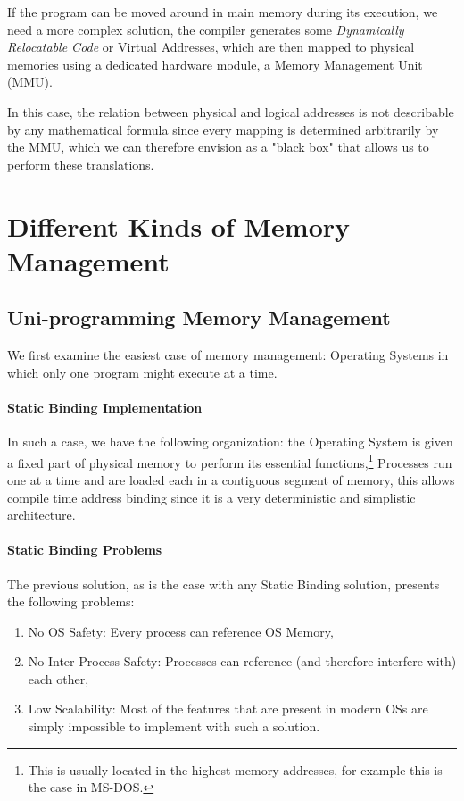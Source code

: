 \documentclass[openright, twoside]{report}
\theoremstyle{definition}
\theoremstyle{example}
\begin{document}
		If the program can be moved around in main memory during its execution, we need a more complex solution, the compiler 
		generates some \emph{Dynamically Relocatable Code} or Virtual Addresses, which are then mapped to physical memories using 
		a dedicated hardware module, a Memory Management Unit (MMU).

		In this case, the relation between physical and logical addresses is not describable by any mathematical formula since 
		every mapping is determined arbitrarily by the MMU, which we can therefore envision as a "black box" that allows us 
		to perform these translations.
	
	\section{Different Kinds of Memory Management}
		\subsection{Uni-programming Memory Management}

		We first examine the easiest case of memory management: Operating Systems in which only one program might execute at a time.

		\paragraph{Static Binding Implementation}
		In such a case, we have the following organization: the Operating System is given a fixed part of physical memory to perform 
		its essential functions,\footnote{This is usually located in the highest memory addresses, for example this is the case in MS-DOS.}
		Processes run one at a time and are loaded each in a contiguous segment of memory, this allows compile time address binding 
		since it is a very deterministic and simplistic architecture.

		\paragraph{Static Binding Problems}
		The previous solution, as is the case with any Static Binding solution, presents the following problems:
		\begin{enumerate}
			\item No OS Safety: Every process can reference OS Memory,
			\item No Inter-Process Safety: Processes can reference (and therefore interfere with) each other,
			\item Low Scalability: Most of the features that are present in modern OSs are simply impossible to 
			implement with such a solution.
		\end{enumerate}
\end{document}
